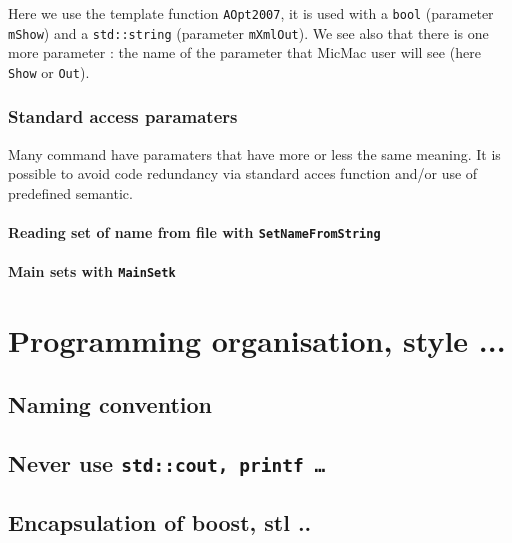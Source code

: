 \documentclass[a4paper]{book}
\begin{document}
{Here we use the template function {\tt AOpt2007},
it is used with a {\tt bool} (parameter {\tt mShow})
and a {\tt std::string} (parameter {\tt mXmlOut}).
We see also that there is one more parameter : the name of the 
parameter that MicMac user will see (here {\tt Show} or {\tt Out}).


\subsection{Standard access paramaters}

Many command have paramaters that have more or less the
same meaning. It is possible to avoid code redundancy
via standard acces function and/or use of predefined semantic.

\subsubsection{Reading set of name from file with {\tt  SetNameFromString}}
\subsubsection{Main sets with {\tt MainSetk}}




\chapter{Programming organisation, style ...}

\section{Naming convention}

\section{Never use {\tt std::cout, printf \dots}}

\section{Encapsulation of boost, stl ..}
}
\end{document}
